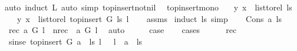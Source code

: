 \begin{isabellebody}
%
\isatagproof
{}\isamarkupfalse%
{\isacharparenleft}{\kern0pt}auto{\isacharcomma}{\kern0pt}\ induct\ L{\isacharcomma}{\kern0pt}\ auto\ simp{\isacharcolon}{\kern0pt}\ top{\isacharunderscore}{\kern0pt}insert{\isacharunderscore}{\kern0pt}not{\isacharunderscore}{\kern0pt}nil{\isacharparenright}{\kern0pt}\ \isamarkupfalse%
%
\endisatagproof
{\isafoldproof}%
%
\isadelimproof
\isanewline
%
\endisadelimproof
\isanewline
{}\isamarkupfalse%
\ top{\isacharunderscore}{\kern0pt}insert{\isacharunderscore}{\kern0pt}mono{\isacharcolon}{\kern0pt}\isanewline
\ \ \ {\isachardoublequoteopen}{\isacharparenleft}{\kern0pt}y{\isacharcomma}{\kern0pt}\ x{\isacharparenright}{\kern0pt}\ {\isasymin}\ list{\isacharunderscore}{\kern0pt}to{\isacharunderscore}{\kern0pt}rel\ ls{\isachardoublequoteclose}\isanewline
\ \ \ {\isachardoublequoteopen}{\isacharparenleft}{\kern0pt}y{\isacharcomma}{\kern0pt}\ x{\isacharparenright}{\kern0pt}\ {\isasymin}\ list{\isacharunderscore}{\kern0pt}to{\isacharunderscore}{\kern0pt}rel\ {\isacharparenleft}{\kern0pt}top{\isacharunderscore}{\kern0pt}insert\ G\ ls\ l{\isacharparenright}{\kern0pt}{\isachardoublequoteclose}\isanewline
%
\isadelimproof
\ \ %
\endisadelimproof
%
\isatagproof
{}\isamarkupfalse%
\ assms\ \isanewline
{}\isamarkupfalse%
{\isacharparenleft}{\kern0pt}induct\ ls{\isacharcomma}{\kern0pt}\ simp{\isacharparenright}{\kern0pt}\isanewline
\ \ \isamarkupfalse%
\ {\isacharparenleft}{\kern0pt}Cons\ a\ ls{\isacharparenright}{\kern0pt}\isanewline
\ \ \isamarkupfalse%
\ {\isacharparenleft}{\kern0pt}rec{\isacharparenright}{\kern0pt}\ {\isachardoublequoteopen}a\ {\isasymrightarrow}\isactrlsup {\isacharplus}{\kern0pt}\isactrlbsub G\isactrlesub \ l{\isachardoublequoteclose}\ {\isacharbar}{\kern0pt}\ {\isacharparenleft}{\kern0pt}nrec{\isacharparenright}{\kern0pt}\ {\isachardoublequoteopen}{\isasymnot}\ a\ {\isasymrightarrow}\isactrlsup {\isacharplus}{\kern0pt}\isactrlbsub G\isactrlesub \ l{\isachardoublequoteclose}\ \isamarkupfalse%
\ auto\isanewline
\ \ \isamarkupfalse%
\ \isamarkupfalse%
\ {\isacharquery}{\kern0pt}case\ \isanewline
\ \ \isamarkupfalse%
{\isacharparenleft}{\kern0pt}cases{\isacharparenright}{\kern0pt}\isanewline
\ \ \ \ \isamarkupfalse%
\ rec\isanewline
\ \ \ \ \isamarkupfalse%
\ \isamarkupfalse%
\ sinse{\isacharcolon}{\kern0pt}\ {\isachardoublequoteopen}{\isacharparenleft}{\kern0pt}top{\isacharunderscore}{\kern0pt}insert\ G\ {\isacharparenleft}{\kern0pt}a\ {\isacharhash}{\kern0pt}\ ls{\isacharparenright}{\kern0pt}\ l{\isacharparenright}{\kern0pt}\ \ {\isacharequal}{\kern0pt}\ l\ {\isacharhash}{\kern0pt}\ a\ {\isacharhash}{\kern0pt}\ ls{\isachardoublequoteclose}\isanewline

\end{isabellebody}
